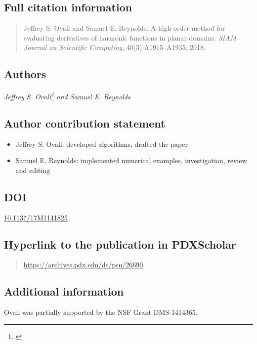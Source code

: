 \subsection*{Full citation information}
  \begin{quote}
    Jeffrey S. Ovall and Samuel E. Reynolds.
    A high-order method for evaluating derivatives of harmonic functions in planar domains.
    \textit{SIAM Journal on Scientific Computing}, 40(3):A1915--A1935, 2018.
  \end{quote}

\subsection*{Authors}
  \textit{Jeffrey S. Ovall\footnote{\label{PSU-affil-1}\PSU} and
  Samuel E. Reynolds}

\subsection*{Author contribution statement}
  \begin{itemize}
    \item Jeffrey S. Ovall:  developed algorithms, drafted the paper
    \item Samuel E. Reynolds: implemented numerical examples, investigation, review and editing
  \end{itemize}

\subsection*{DOI}
  \href{https://doi.org/10.1137/17M1141825}{10.1137/17M1141825}

\subsection*{Hyperlink to the publication in PDXScholar}
  \begin{quote}
    \url{https://archives.pdx.edu/ds/psu/26690}
  \end{quote}

\subsection*{Additional information}
  Ovall was partially supported by the NSF Grant DMS-1414365.